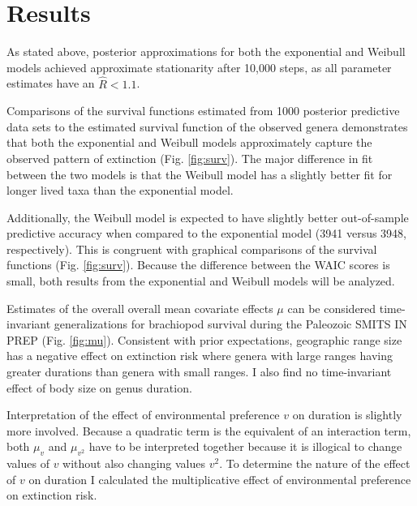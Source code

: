 \documentclass[12pt,letterpaper]{article}
\begin{document}
\section{Results}

As stated above, posterior approximations for both the exponential and Weibull models achieved approximate stationarity after 10,000 steps, as all parameter estimates have an \(\hat{R} < 1.1\).%

Comparisons of the survival functions estimated from 1000 posterior predictive data sets to the estimated survival function of the observed genera demonstrates that both the exponential and Weibull models approximately capture the observed pattern of extinction (Fig. \ref{fig:surv}). The major difference in fit between the two models is that the Weibull model has a slightly better fit for longer lived taxa than the exponential model.



Additionally, the Weibull model is expected to have slightly better out-of-sample predictive accuracy when compared to the exponential model (3941 versus 3948, respectively). This is congruent with graphical comparisons of the survival functions (Fig. \ref{fig:surv}). Because the difference between the WAIC scores is small, both results from the exponential and Weibull models will be analyzed.

Estimates of the overall overall mean covariate effects \(\mu\) can be considered time-invariant generalizations for brachiopod survival during the Paleozoic \uppercase{Smits in prep} (Fig. \ref{fig:mu}). Consistent with prior expectations, geographic range size has a negative effect on extinction risk where genera with large ranges having greater durations than genera with small ranges. I also find no time-invariant effect of body size on genus duration. 

Interpretation of the effect of environmental preference \(v\) on duration is slightly more involved. Because a quadratic term is the equivalent of an interaction term, both \(\mu_{v}\) and \(\mu_{v^{2}}\) have to be interpreted together because it is illogical to change values of \(v\) without also changing values \(v^{2}\). To determine the nature of the effect of \(v\) on duration I calculated the multiplicative effect of environmental preference on extinction risk.
\end{document}
